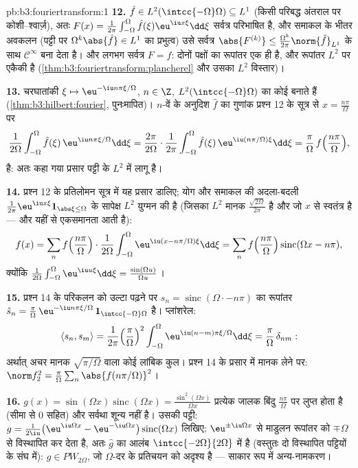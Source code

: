 \begin{solution}{pb:b3:fouriertransform:1}
\textbf{12.} $\hat f \in L^2(\intcc{-\Omega}\Omega)
\subseteq L^1$ (किसी परिबद्ध अंतराल पर कोशी--श्वार्ज़), अतः $F(x) = \frac1{2\pi}\int_{-\Omega}^\Omega\hat
f(\xi)\eu^{\iu x\xi}\dd\xi$
सर्वत्र परिभाषित है, और समाकल के भीतर अवकलन (पट्टी पर $\Omega^k\abs{\hat f} \in L^1$ का
प्रभुत्व) उसे सर्वत्र $\abs{F^{(k)}} \leq
\frac{\Omega^k}{2\pi}\norm{\hat f}_{L^1}$ के साथ $\mathcal C^\infty$ बना देता है। और लगभग सर्वत्र
$F
= f$: दोनों पक्षों का रूपांतर एक ही है, और रूपांतर $L^2$ पर एकैकी
है (\cref{thm:b3:fouriertransform:plancherel} और उसका $L^2$ विस्तार)।

\textbf{13.} चरघातांकी $\xi \mapsto \eu^{-\iu
n\pi\xi/\Omega}$, $n \in \Z$, $L^2(\intcc{-\Omega}\Omega)$ का कोई  बनाते
हैं (\cref{thm:b3:hilbert:fourier}, पुनःमापित)। $n$-वें के अनुदिश $\hat f$ का गुणांक प्रश्न
12 के सूत्र से $x = \frac{n\pi}\Omega$ पर
\[
\frac1{2\Omega}\int_{-\Omega}^\Omega\hat f(\xi)\,
\eu^{\iu n\pi\xi/\Omega}\dd\xi
= \frac{2\pi}{2\Omega}\cdot
\frac1{2\pi}\int_{-\Omega}^{\Omega}\hat f(\xi)\,
\eu^{\iu(n\pi/\Omega)\xi}\dd\xi
= \frac\pi\Omega\,f\Bigl(\frac{n\pi}\Omega\Bigr),
\]
है: अतः कहा गया प्रसार पट्टी के $L^2$ में लागू है।

\textbf{14.} प्रश्न 12 के प्रतिलोमन सूत्र में यह प्रसार डालिए; योग
और समाकल की अदला-बदली $\frac1{2\pi}
\eu^{\iu x\xi}\mathbf 1_{\abs\xi\leq\Omega}$ के सापेक्ष $L^2$ युग्मन की  है
(जिसका $L^2$ मानक $\frac{\sqrt{2\Omega}}{2\pi}$ है और जो $x$ से स्वतंत्र है --- और यहीं
से एकसमानता आती है):
\[
f(x) = \sum_nf\Bigl(\frac{n\pi}\Omega\Bigr)\cdot
\frac1{2\Omega}\int_{-\Omega}^\Omega
\eu^{\iu(x - n\pi/\Omega)\xi}\dd\xi
= \sum_nf\Bigl(\frac{n\pi}\Omega\Bigr)
\operatorname{sinc}(\Omega x - n\pi),
\]
क्योंकि $\frac1{2\Omega}\int_{-\Omega}^\Omega\eu^{\iu
u\xi}\dd\xi = \frac{\sin(\Omega u)}{\Omega u}$।

\textbf{15.} प्रश्न 14 के परिकलन को उल्टा पढ़ने पर $s_n = \operatorname{sinc}(\Omega\cdot -
n\pi)$ का रूपांतर
$\hat s_n = \frac\pi\Omega\,\eu^{-\iu
n\pi\xi/\Omega}\,\mathbf 1_{\intcc{-\Omega}\Omega}$ है। प्लांशरेल:
\[
\langle s_n, s_m\rangle = \frac1{2\pi}
\Bigl(\frac\pi\Omega\Bigr)^2\int_{-\Omega}^\Omega
\eu^{\iu(n-m)\pi\xi/\Omega}\dd\xi =
\frac\pi\Omega\,\delta_{nm} :
\]
अर्थात् अचर मानक $\sqrt{\pi/\Omega}$ वाला कोई लांबिक कुल। प्रश्न 14 के प्रसार में
मानक लेने पर: $\norm f_2^2 =
\frac\pi\Omega\sum_n\abs{f(n\pi/\Omega)}^2$।

\textbf{16.} $g(x) = \sin(\Omega x)\operatorname{sinc}
(\Omega x) = \frac{\sin^2(\Omega x)}{\Omega x}$ प्रत्येक जालक बिंदु $\frac{n\pi}\Omega$ पर लुप्त होता है (सीमा
से $0$ सहित) और सर्वथा शून्य नहीं है। उसकी पट्टी: $g =
\frac1{2\iu}\bigl(\eu^{\iu\Omega x} - \eu^{-\iu\Omega
x}\bigr)\operatorname{sinc}(\Omega x)$ लिखिए;
$\eu^{\pm\iu\Omega x}$ से माडुलन रूपांतर को $\mp\Omega$ से विस्थापित कर देता है, अतः $\hat g$
का आलंब $\intcc{-2\Omega}{2\Omega}$ में है (वस्तुतः दो विस्थापित पट्टियों के संघ में):
$g \in PW_{2\Omega}$, जो $\Omega$-दर के प्रतिचयन को अदृश्य है --- साकार रूप में अन्य-नामकरण।


\end{solution}
